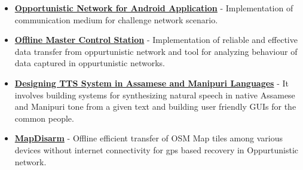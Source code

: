 \documentclass[margin, centered]{res}
\begin{document}
\begin{resume}
\begin{itemize}[leftmargin=*]
 \item \textbf{\href{https://github.com/ItsForkIT/pdm}{Opportunistic Network for Android Application}} - Implementation of communication medium for challenge network scenario. 
 \item \textbf{\href{http://www.github.com/hridaydutta123/offlinemcs}{Offline Master Control Station}} - Implementation of reliable and effective data transfer from oppurtunistic network and tool for analyzing behaviour of data captured in oppurtunistic networks.
 \item \textbf{\href{http://www.iitg.ernet.in/cseweb/tts/tts/Assamese/}{Designing TTS System in Assamese and Manipuri Languages}} - It involves building systems for synthesizing natural speech in native Assamese and Manipuri tone from a given text and building user friendly GUIs for the common people.

 \item \textbf{\href{https://github.com/hridaydutta123/MapDisarm}{MapDisarm}} - Offline efficient transfer of OSM Map tiles among various devices without internet connectivity for gps based recovery in Oppurtunistic network.
\end{itemize}


\end{resume}
\end{document}
